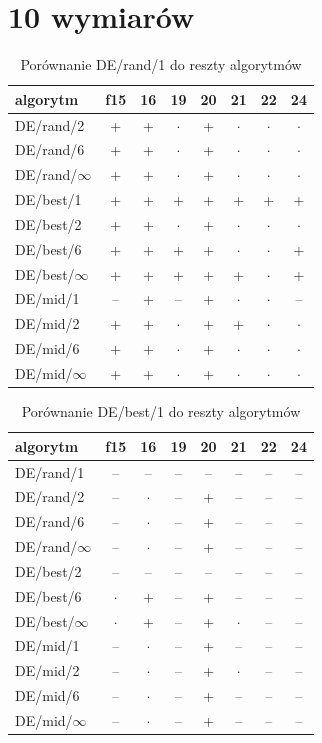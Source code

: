 \documentclass[a4paper,onecolumn,oneside,11pt,wide,floatssmall]{mwrep}
\theoremstyle{definition}
\theoremstyle{plain}%
\theoremstyle{remark}
\begin{document}
\section{10 wymiarów}

\begin{table}[H]
\centering
\begin{tabular}{ l | c | c | c | c | c | c | c }
algorytm         &f15& 16& 19& 20& 21& 22& 24 \\ \hline
DE/rand/2	 & + & + & $\cdot$ & + & $\cdot$ & $\cdot$ & $\cdot$ \\
DE/rand/6	 & + & + & $\cdot$ & + & $\cdot$ & $\cdot$ & $\cdot$ \\
DE/rand/$\infty$	 & + & + & $\cdot$ & + & $\cdot$ & $\cdot$ & $\cdot$ \\
DE/best/1	 & + & + & + & + & + & + & + \\
DE/best/2	 & + & + & $\cdot$ & + & $\cdot$ & $\cdot$ & $\cdot$ \\
DE/best/6	 & + & + & + & + & $\cdot$ & $\cdot$ & + \\
DE/best/$\infty$	 & + & + & + & + & + & $\cdot$ & + \\
DE/mid/1	 & -- & + & -- & + & $\cdot$ & $\cdot$ & -- \\
DE/mid/2	 & + & + & $\cdot$ & + & + & $\cdot$ & $\cdot$ \\
DE/mid/6	 & + & + & $\cdot$ & + & $\cdot$ & $\cdot$ & $\cdot$ \\
DE/mid/$\infty$	 & + & + & $\cdot$ & + & $\cdot$ & $\cdot$ & $\cdot$ \\
\end{tabular}
\caption{Porównanie DE/rand/1 do reszty algorytmów}
\end{table}

\begin{table}[H]
\centering
\begin{tabular}{ l | c | c | c | c | c | c | c }
algorytm         &f15& 16& 19& 20& 21& 22& 24 \\ \hline
DE/rand/1	 & -- & -- & -- & -- & -- & -- & -- \\
DE/rand/2	 & -- & $\cdot$ & -- & + & -- & -- & -- \\
DE/rand/6	 & -- & $\cdot$ & -- & + & -- & -- & -- \\
DE/rand/$\infty$	 & -- & $\cdot$ & -- & + & -- & -- & -- \\
DE/best/2	 & -- & -- & -- & -- & -- & -- & -- \\
DE/best/6	 & $\cdot$ & + & -- & + & -- & -- & -- \\
DE/best/$\infty$	 & $\cdot$ & + & -- & + & $\cdot$ & -- & -- \\
DE/mid/1	 & -- & $\cdot$ & -- & + & -- & -- & -- \\
DE/mid/2	 & -- & $\cdot$ & -- & + & $\cdot$ & -- & -- \\
DE/mid/6	 & -- & $\cdot$ & -- & + & -- & -- & -- \\
DE/mid/$\infty$	 & -- & $\cdot$ & -- & + & -- & -- & -- \\
\end{tabular}
\caption{Porównanie DE/best/1 do reszty algorytmów}
\end{table}
\end{document}
